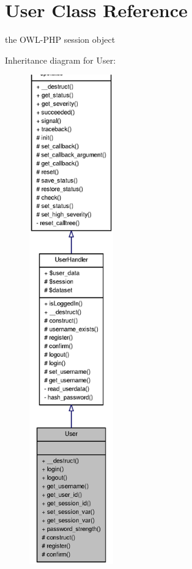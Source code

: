 \section{User Class Reference}
\label{classUser}


the OWL-\/PHP session object  




Inheritance diagram for User:
\nopagebreak
\begin{figure}[H]
\begin{center}
\leavevmode
\includegraphics[height=600pt]{classUser__inherit__graph}
\end{center}
\end{figure}



